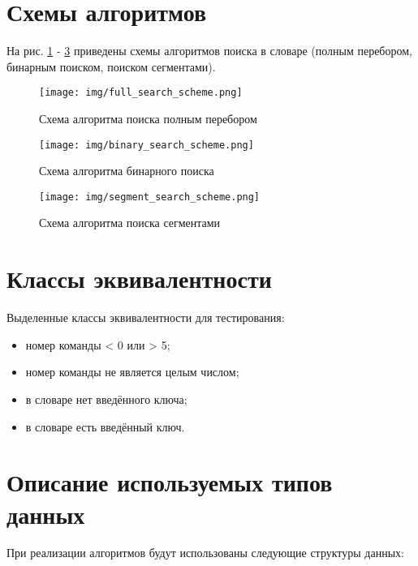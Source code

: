 \documentclass[a4paper,14pt, unknownkeysallowed]{extreport}
\begin{document}
\section{Схемы алгоритмов}

На рис. \ref{fig:full_search} - \ref{fig:segment_search} приведены схемы алгоритмов поиска в словаре (полным перебором, бинарным поиском, поиском сегментами).

\begin{figure}[h]
	\centering
	\texttt{[image: img/full\_search\_scheme.png]}
	\caption{Схема алгоритма поиска полным перебором}
	\label{fig:full_search}
\end{figure}

\clearpage

\begin{figure}[h]
	\centering
	\texttt{[image: img/binary\_search\_scheme.png]}
	\caption{Схема алгоритма бинарного поиска}
	\label{fig:binary_search}
\end{figure}

\clearpage

\begin{figure}[h]
	\centering
	\texttt{[image: img/segment\_search\_scheme.png]}
	\caption{Схема алгоритма поиска сегментами}
	\label{fig:segment_search}
\end{figure}

\clearpage


\section{Классы эквивалентности}

Выделенные классы эквивалентности для тестирования:

\begin{itemize}
	\item номер команды < 0 или > 5;
	\item номер команды не является целым числом;
	\item в словаре нет введённого ключа;
	\item в словаре есть введённый ключ.
\end{itemize}

\section{Описание используемых типов данных}

При реализации алгоритмов будут использованы следующие структуры данных:
\end{document}
